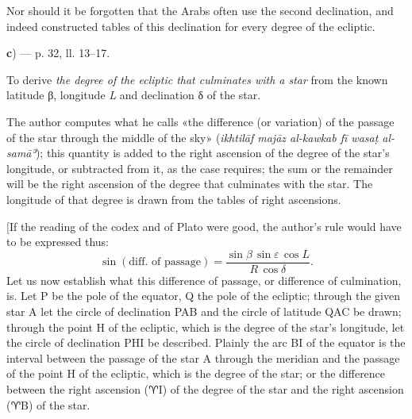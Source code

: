 \documentclass[11pt]{article}
\newcommand{\Pg}[1]{\marginpar{\footnotesize\color{gray}#1}}
\begin{document}
\par Nor should it be forgotten that the Arabs often use the second declination, and indeed constructed tables of this declination for every degree of the ecliptic.\par
\par\begin{center}\textbf{c}) — p. 32, ll. 13–17.\end{center}
\par To derive \emph{the degree of the ecliptic that culminates with a star} from the known latitude {\greekfont β}, longitude \emph{L} and declination {\greekfont δ} of the star.\par
\par \Pg{I 194}The author computes what he calls «the difference (or variation) of the passage of the star through the middle of the sky» (\emph{ikhtilāf majāz al-kawkab fī wasaṭ al-samāʾ}); this quantity is added to the right ascension of the degree of the star's longitude, or subtracted from it, as the case requires; the sum or the remainder will be the right ascension of the degree that culminates with the star. The longitude of that degree is drawn from the tables of right ascensions.\par
\begin{center}\end{center}
\par [If the reading of the codex and of Plato were good, the author's rule would have to be expressed thus: \[ \sin(\text{diff. of passage}) = \frac{\sin\beta\,\sin\varepsilon\,\cos L}{R\,\cos\delta}. \] Let us now establish what this difference of passage, or difference of culmination, is. Let P be the pole of the equator, Q the pole of the ecliptic; through the given star A let the circle of declination PAB and the circle of latitude QAC be drawn; through the point H of the ecliptic, which is the degree of the star's longitude, let the circle of declination PHI be described. Plainly the arc BI of the equator is the interval between the passage of the star A through the meridian and the passage of the point H of the ecliptic, which is the degree of the star; or the difference between the right ascension ({\MoonFont\upshape ♈}I) of the degree of the star and the right ascension ({\MoonFont\upshape ♈}B) of the star.\par
\end{document}
